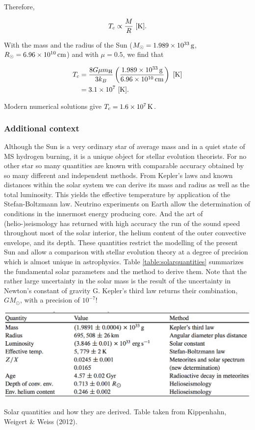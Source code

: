 \documentclass[a4paper,10pt]{article}
\begin{document}
{\noindent}Therefore,

\begin{align*}
    T_c \propto \frac{M}{R} ~ [{\rm K}].
\end{align*}

{\noindent}With the mass and the radius of the Sun ($M_\odot=1.989\times10^{33}\,{\rm g}$, $R_\odot=6.96\times10^{10}\,{\rm cm}$) and with $\mu=0.5$, we find that

\begin{align*}
    T_c &= \frac{8G\mu m_{\rm H}}{3k_B}\left(\frac{1.989\times10^{33}\,{\rm g}}{6.96\times10^{10}\,{\rm cm}}\right) ~ [{\rm K}] \\
    &= 3.1\times10^7 ~ [{\rm K}].
\end{align*}

{\noindent}Modern numerical solutions give $T_c=1.6\times10^7\,{\rm K}$.

\subsubsection{Additional context}

Although the Sun is a very ordinary star of average mass and in a quiet state of MS hydrogen burning, it is a unique object for stellar evolution theorists. For no other star so many quantities are known with comparable accuracy obtained by so many different and independent methods. From Kepler's laws and known distances within the solar system we can derive its mass and radius as well as the total luminosity. This yields the effective temperature by application of the Stefan-Boltzmann law. Neutrino experiments on Earth allow the determination of conditions in the innermost energy producing core. And the art of (helio-)seismology has returned with high accuracy the run of the sound speed throughout most of the solar interior, the helium content of the outer convective envelope, and its depth. These quantities restrict the modelling of the present Sun and allow a comparison with stellar evolution theory at a degree of precision which is almost unique in astrophysics. Table \ref{table:solarquantities} summarizes the fundamental solar parameters and the method to derive them. Note that the rather large uncertainty in the solar mass is the result of the uncertainty in Newton's constant of gravity G. Kepler's third law returns their combination, $GM_\odot$, with a precision of $10^{-7}$!

\begin{table}[t]
    \centering
    \includegraphics[width=14cm]{figures/SolarQuantities.png}
    \caption{\footnotesize{Solar quantities and how they are derived. Table taken from Kippenhahn, Weigert \& Weiss (2012).}}
    \label{table:solarquantities}
\end{table}
\end{document}
